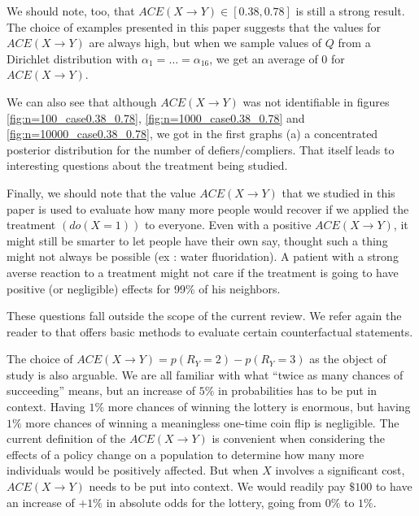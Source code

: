 \documentclass[a4paper, 10pt]{article}
\begin{document}
We should note, too, that $ACE(X\rightarrow Y) \in [0.38, 0.78]$ is still a
strong result. The choice of examples presented in this paper suggests that the
values for $ACE(X\rightarrow Y)$ are always high, but when we sample values of
$Q$ from a Dirichlet distribution with $\alpha_1 = \ldots = \alpha_{16}$, we get
an average of 0 for $ACE(X\rightarrow Y)$.

We can also see that although $ACE(X\rightarrow Y)$ was not identifiable in
figures \ref{fig:n=100_case0.38_0.78},
\ref{fig:n=1000_case0.38_0.78} and \ref{fig:n=10000_case0.38_0.78}, we got in
the first graphs (a) a concentrated posterior distribution for the number of
defiers/compliers. That itself leads to interesting questions about the
treatment being studied.

Finally, we should note that the value $ACE(X\rightarrow Y)$ that we studied in
this paper is used to evaluate how many more people would recover if we applied
the treatment $(\textit{do}(X=1))$ to everyone. Even with a
positive $ACE(X\rightarrow Y)$, it might still be smarter to let people have
their own say, thought such a thing might not always be possible (ex : water
fluoridation). A patient with a strong averse reaction to a treatment might not
care if the treatment is going to have positive (or negligible) effects for
99\% of his neighbors.

These questions fall outside the scope of the current review. We refer again
the reader to \cite{pearl2000cmr} that offers basic methods to evaluate certain
counterfactual statements.

The choice of $ACE(X\rightarrow Y) = p(R_Y=2) - p(R_Y=3)$ as the object of
study is also arguable. We are all familiar with what
``twice as many chances of succeeding'' means, but an increase of $5\%$ in
probabilities has to be put in context. Having $1\%$ more chances of
winning the lottery is enormous, but having $1\%$ more chances of winning a
meaningless one-time coin flip is negligible. The current
definition of the $ACE(X\rightarrow Y)$ is convenient when considering the
effects of a policy change on a population to determine how many more
individuals would be positively affected. But when $X$ involves a significant
cost, $ACE(X\rightarrow Y)$ needs to be put into context. We would readily pay
$\$100$ to have an increase of $+1\%$ in absolute odds for the lottery, going
from $0\%$ to $1\%$.



\end{document}
